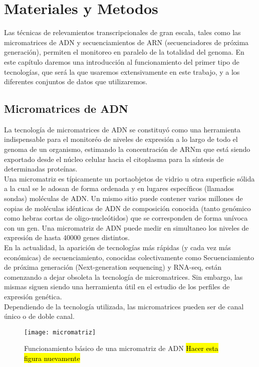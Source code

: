 \chapter{Materiales y Metodos}\label{materiales_y_metodos}
Las técnicas de relevamientos transcripcionales de gran escala, tales como las micromatrices de ADN y secuenciamientos de ARN (secuenciadores de próxima generación), permiten el monitoreo en paralelo de la totalidad del genoma. En este capítulo daremos una introducción al funcionamiento del primer tipo de tecnologías, que será la que usaremos extensivamente en este trabajo, y a los diferentes conjuntos de datos que utilizaremos.\cite{Bose2016}

\section{Micromatrices de ADN}
La tecnología de micromatrices de ADN se constituyó como una herramienta indispensable para el monitoréo de niveles de expresión a lo largo de todo el genoma de un organismo, estimando la concentración de ARNm que está siendo exportado desde el núcleo celular hacia el citoplasma para la síntesis de determinadas proteínas.\\
Una micromatriz es típicamente un portaobjetos de vidrio u otra superficie sólida a la cual se le adosan de forma ordenada y en lugares específicos (llamados sondas) moléculas de ADN. Un mismo sitio puede contener varios millones de copias de moléculas idénticas de ADN de composición conocida (tanto genómico como hebras cortas de oligo-nucleótidos) que se corresponden de forma unívoca con un gen. Una micromatriz de ADN puede medir en simultaneo los niveles de expresión de hasta 40000 genes distintos.\\
En la actualidad, la aparición de tecnologías más rápidas (y cada vez más económicas) de secuenciamiento, conocidas colectivamente como Secuenciamiento de próxima generación (Next-generation sequencing) y RNA-seq, están comenzando a dejar obsoleta la tecnología de micromatrices. Sin embargo, las mismas siguen siendo una herramienta útil en el estudio de los perfiles de expresión genética.\\
Dependiendo de la tecnología utilizada, las micromatrices pueden ser de canal único o de doble canal.\\
\begin{figure}[h]
    \centering
    \texttt{[image: micromatriz]}
    \caption{Funcionamiento básico de una micromatriz de ADN \hl{Hacer esta figura nuevamente}}
    \label{fig:micromatriz}
\end{figure}
